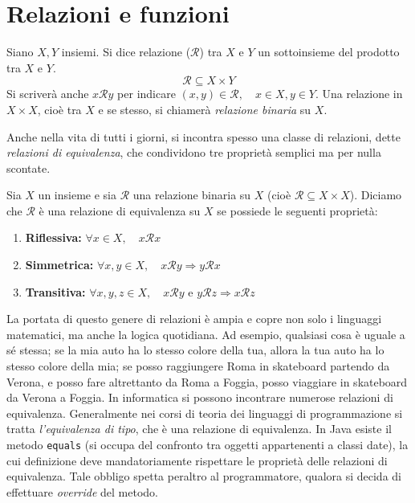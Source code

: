\documentclass[oneside]{book}
\theoremstyle{remark}
\begin{document}
\section{Relazioni e funzioni}
\begin{tcolorbox}[colback=yellow!30, colframe=yellow!30!black, title={Relazione}]
Siano $X,Y$ insiemi. Si dice relazione ($\mathcal{R}$) tra $X$ e $Y$ un sottoinsieme
del prodotto tra $X$ e $Y$.
\[\mathcal{R}\subseteq X\times Y\]
Si scriverà anche $x\mathcal{R}y$ per indicare $(x,y)\in\mathcal{R},
\quad x\in X,y\in Y$. Una relazione in $X\times X$, cioè tra $X$ e se stesso,
si chiamerà \textit{relazione binaria} su $X$.
\end{tcolorbox}

Anche nella vita di tutti i giorni, si incontra spesso una classe di relazioni,
dette \textit{relazioni di equivalenza}, che condividono tre proprietà semplici ma per
nulla scontate.

\begin{tcolorbox}[colback=yellow!30, colframe=yellow!30!black, title={Relazione di equivalenza}]
Sia $X$ un insieme e sia $\mathcal{R}$ una relazione binaria su $X$
(cioè $\mathcal{R} \subseteq X \times X$). Diciamo che $\mathcal{R}$ è una
relazione di equivalenza su $X$ se possiede le seguenti proprietà:
\begin{enumerate}
    \item \textbf{Riflessiva:} $\forall x \in X, \quad x \mathcal{R} x$
    \item \textbf{Simmetrica:} $\forall x,y \in X, \quad x \mathcal{R}y \Longrightarrow y \mathcal{R} x$
    \item \textbf{Transitiva:} $\forall x,y,z \in X, \quad x \mathcal{R} y \text{ e } y \mathcal{R} z \Longrightarrow x \mathcal{R} z$
\end{enumerate}
\end{tcolorbox}
La portata di questo genere di relazioni è ampia e copre non solo i linguaggi
matematici, ma anche la logica quotidiana. Ad esempio, qualsiasi cosa è uguale
a sé stessa; se la mia auto ha lo stesso colore della tua, allora la tua auto ha lo stesso
colore della mia; se posso raggiungere Roma in skateboard partendo da Verona,
e posso fare altrettanto da Roma a Foggia, posso viaggiare in skateboard da
Verona a Foggia. In informatica si possono incontrare numerose relazioni di
equivalenza. Generalmente nei corsi di teoria dei linguaggi di programmazione
si tratta \textit{l'equivalenza di tipo}, che è una relazione di equivalenza.
In Java esiste il metodo \texttt{equals} (si occupa del confronto tra oggetti
appartenenti a classi date), la cui definizione deve mandatoriamente
rispettare le proprietà delle relazioni di equivalenza. Tale obbligo spetta
peraltro al programmatore, qualora si decida di effettuare \textit{override}
del metodo.
\end{document}
